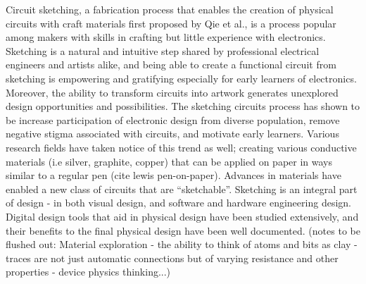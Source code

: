 \documentclass{sigchi}
\begin{document}
Circuit sketching, a fabrication process that enables the creation of physical circuits with craft materials first proposed by Qie et al., is a process popular among makers with skills in crafting but little experience with electronics. Sketching is a natural and intuitive step shared by professional electrical engineers and artists alike, and being able to create a functional circuit from sketching is empowering and gratifying especially for early learners of electronics. Moreover, the ability to transform circuits into artwork generates unexplored design opportunities and possibilities.  
The sketching circuits process has shown to be increase participation of electronic design from diverse population, remove negative stigma associated with circuits, and motivate early learners. Various research fields have taken notice of this trend as well; creating various conductive materials (i.e silver, graphite, copper) that can be applied on paper in ways similar to a regular pen (cite lewis pen-on-paper). Advances in materials have enabled a new class of circuits that are ``sketchable''. 
Sketching is an integral part of design - in both visual design, and software and hardware engineering design. Digital design tools that aid in physical design have been studied extensively, and their benefits to the final physical design have been well documented. (notes to be flushed out: Material exploration - the ability to think of atoms and bits as clay - traces are not just automatic connections but of varying resistance and other properties - device physics thinking...)
\end{document}
